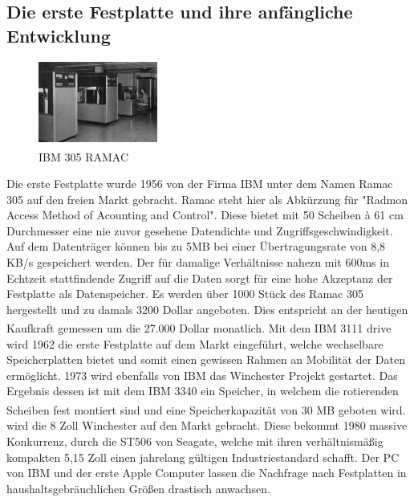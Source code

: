 \documentclass[a4paper, DIV20, 12pt, headsepline, parskip, flushleft]{scrartcl}
\begin{document}
\subsection{Die erste Festplatte und ihre anfängliche Entwicklung}
\begin{figure}
	\vspace{-50pt}
	\begin{center}
    \includegraphics[width=0.35\textwidth]{RAMAC.jpeg}
    \end{center}
    \vspace{-20pt}
	\caption{IBM 305 RAMAC \textsuperscript{\cite{img:ramac}}}
     \vspace{-70pt}
\end{figure} 
Die erste Festplatte wurde 1956 von der Firma IBM unter dem Namen Ramac 305 auf den freien Markt gebracht. Ramac steht hier als Abkürzung für "Radmon Access Method of Acounting and Control". Diese bietet mit 50 Scheiben à 61 cm Durchmesser eine nie zuvor gesehene Datendichte und Zugriffsgeschwindigkeit. Auf dem Datenträger können bis zu 5MB bei einer Übertragungsrate von 8,8 KB/s gespeichert werden.
Der für damalige Verhältnisse nahezu mit 600ms in Echtzeit stattfindende Zugriff auf die Daten sorgt für eine hohe Akzeptanz der Festplatte als Datenspeicher.
Es werden über 1000 Stück des Ramac 305 hergestellt und zu damals 3200 Dollar angeboten. Dies entspricht an der heutigen Kaufkraft gemessen um die 27.000 Dollar monatlich.\textsuperscript{ \cite{ccm} \cite{epv} \cite{hhdd}}\newline
Mit dem IBM 3111 drive wird 1962 die erste Festplatte auf dem Markt eingeführt, welche wechselbare Speicherplatten bietet und somit einen gewissen Rahmen an Mobilität der Daten ermöglicht.
1973 wird ebenfalls von IBM das Winchester Projekt gestartet. Das Ergebnis dessen ist mit dem IBM 3340 ein Speicher, in welchem die rotierenden Scheiben fest montiert sind und eine Speicherkapazität von 30 MB geboten wird.\textsuperscript{\cite{hdd}} wird die 8 Zoll Winchester auf den Markt gebracht. Diese bekommt 1980 massive Konkurrenz, durch die ST506 von Seagate, welche mit ihren verhältnismäßig kompakten 5,15 Zoll einen jahrelang gültigen Industriestandard schafft. Der PC von IBM und der erste Apple Computer lassen die Nachfrage nach Festplatten in haushaltsgebräuchlichen Größen drastisch anwachsen.
\end{document}

